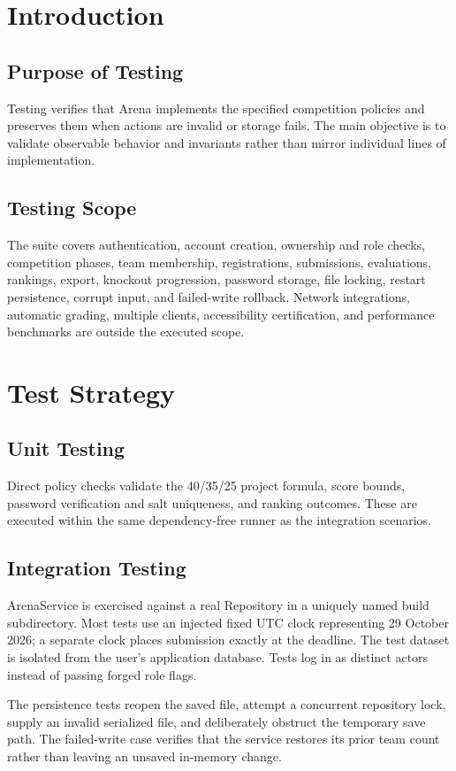 \documentclass[12pt]{article}
\begin{document}
\section{Introduction}
\subsection{Purpose of Testing}
Testing verifies that Arena implements the specified competition policies and preserves them when actions are invalid or storage fails. The main objective is to validate observable behavior and invariants rather than mirror individual lines of implementation.
\subsection{Testing Scope}
The suite covers authentication, account creation, ownership and role checks, competition phases, team membership, registrations, submissions, evaluations, rankings, export, knockout progression, password storage, file locking, restart persistence, corrupt input, and failed-write rollback. Network integrations, automatic grading, multiple clients, accessibility certification, and performance benchmarks are outside the executed scope.

\section{Test Strategy}
\subsection{Unit Testing}
Direct policy checks validate the 40/35/25 project formula, score bounds, password verification and salt uniqueness, and ranking outcomes. These are executed within the same dependency-free runner as the integration scenarios.
\subsection{Integration Testing}
ArenaService is exercised against a real Repository in a uniquely named build subdirectory. Most tests use an injected fixed UTC clock representing 29 October 2026; a separate clock places submission exactly at the deadline. The test dataset is isolated from the user's application database. Tests log in as distinct actors instead of passing forged role flags.

The persistence tests reopen the saved file, attempt a concurrent repository lock, supply an invalid serialized file, and deliberately obstruct the temporary save path. The failed-write case verifies that the service restores its prior team count rather than leaving an unsaved in-memory change.
\end{document}
